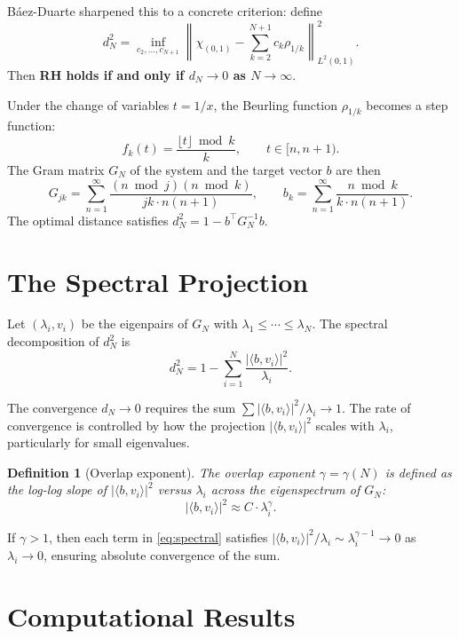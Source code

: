 \documentclass[11pt,a4paper]{article}
\newtheorem{definition}{Definition}
\begin{document}
B\'aez-Duarte \cite{baez2003} sharpened this to a concrete criterion: define
\[
d_N^2 = \inf_{c_2, \ldots, c_{N+1}} \left\| \chi_{(0,1)} - \sum_{k=2}^{N+1} c_k \rho_{1/k} \right\|_{L^2(0,1)}^2.
\]
Then \textbf{RH holds if and only if $d_N \to 0$ as $N \to \infty$}.

Under the change of variables $t = 1/x$, the Beurling function $\rho_{1/k}$ becomes a step function:
\[
f_k(t) = \frac{\lfloor t \rfloor \bmod k}{k}, \qquad t \in [n, n+1).
\]
The Gram matrix $G_N$ of the system and the target vector $b$ are then
\[
G_{jk} = \sum_{n=1}^{\infty} \frac{(n \bmod j)(n \bmod k)}{jk \cdot n(n+1)}, \qquad
b_k = \sum_{n=1}^{\infty} \frac{n \bmod k}{k \cdot n(n+1)}.
\]
The optimal distance satisfies $d_N^2 = 1 - b^\top G_N^{-1} b$.

\section{The Spectral Projection}

Let $(\lambda_i, v_i)$ be the eigenpairs of $G_N$ with $\lambda_1 \leq \cdots \leq \lambda_N$. The spectral decomposition of $d_N^2$ is
\begin{equation}\label{eq:spectral}
d_N^2 = 1 - \sum_{i=1}^{N} \frac{|\langle b, v_i \rangle|^2}{\lambda_i}.
\end{equation}

The convergence $d_N \to 0$ requires the sum $\sum |\langle b, v_i \rangle|^2 / \lambda_i \to 1$. The rate of convergence is controlled by how the projection $|\langle b, v_i \rangle|^2$ scales with $\lambda_i$, particularly for small eigenvalues.

\begin{definition}[Overlap exponent]
The \emph{overlap exponent} $\gamma = \gamma(N)$ is defined as the log-log slope of $|\langle b, v_i \rangle|^2$ versus $\lambda_i$ across the eigenspectrum of $G_N$:
\[
|\langle b, v_i \rangle|^2 \approx C \cdot \lambda_i^{\gamma}.
\]
\end{definition}

If $\gamma > 1$, then each term in \eqref{eq:spectral} satisfies $|\langle b, v_i \rangle|^2 / \lambda_i \sim \lambda_i^{\gamma - 1} \to 0$ as $\lambda_i \to 0$, ensuring absolute convergence of the sum.

\section{Computational Results}
\end{document}
